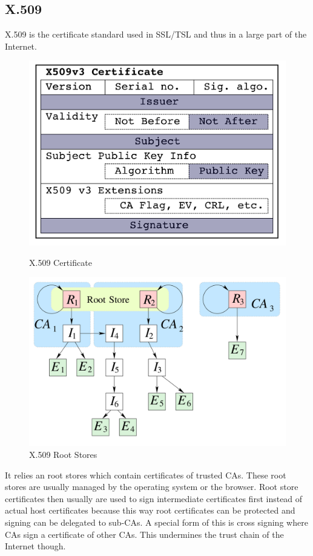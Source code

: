 \subsection{X.509}
X.509 is the certificate standard used in SSL/TSL and thus in a large part of the Internet.
\begin{figure}[h]
  \begin{minipage}{.49\textwidth}
    \centering
    \includegraphics[width=\textwidth]{figures/x509_certificate.png}
    \caption{X.509 Certificate}\label{fig:x509_certificate}
  \end{minipage}
  \begin{minipage}{.49\textwidth}
    \includegraphics[width=\textwidth]{figures/x509_root_store.png}
    \caption{X.509 Root Stores}\label{fig:x509_root_store}
  \end{minipage}
\end{figure}
It relies an root stores which contain certificates of trusted CAs.
These root stores are usually managed by the operating system or the browser.
Root store certificates then usually are used to sign intermediate certificates first instead of actual host certificates because this way root certificates can be protected and signing can be delegated to sub-CAs.
A special form of this is cross signing where CAs sign a certificate of other CAs.
This undermines the trust chain of the Internet though.

